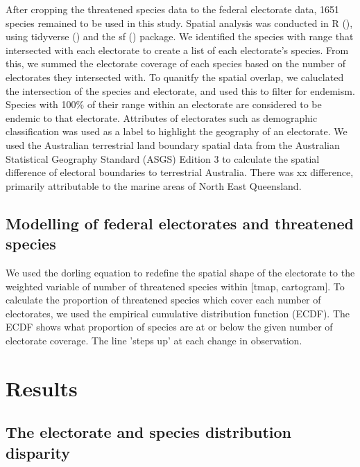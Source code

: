 \documentclass[a4paper,11pt]{article}
\begin{document}
After cropping the threatened species data to the federal electorate data, 1651 species remained to be used in this study. Spatial analysis was conducted in R (\cite{rcoreteamLanguageEnvironmentStatistical2021}), using tidyverse (\cite{wickhamWelcomeTidyverse2019}) and the sf (\cite{pebesmaSimpleFeaturesStandardized2018}) package. We identified the species with range that intersected with each electorate to create a list of each electorate's species. From this, we summed the electorate coverage of each species based on the number of electorates they intersected with. To quanitfy the spatial overlap, we caluclated the intersection of the species and electorate, and used this to filter for endemism. Species with 100\% of their range within an electorate are considered to be endemic to that electorate. Attributes of electorates such as demographic classification was used as a label to highlight the geography of an electorate.
We used the Australian terrestrial land boundary spatial data from the Australian Statistical Geography Standard (ASGS) Edition 3 \cite{australianbureauofstatisticsAustralianStatisticalGeography2021} to calculate the spatial difference of electoral boundaries to terrestrial Australia. There was xx difference, primarily attributable to the marine areas of North East Queensland.

\subsection{Modelling of federal electorates and threatened species}

We used the dorling equation to redefine the spatial shape of the electorate to the weighted variable of number of threatened species within [tmap, cartogram].
To calculate the proportion of threatened species which cover each number of electorates, we used the empirical cumulative distribution function (ECDF). The ECDF shows what proportion of species are at or below the given number of electorate coverage. The line 'steps up' at each change in observation.

\section{Results}

\subsection{The electorate and species distribution disparity}
\end{document}
